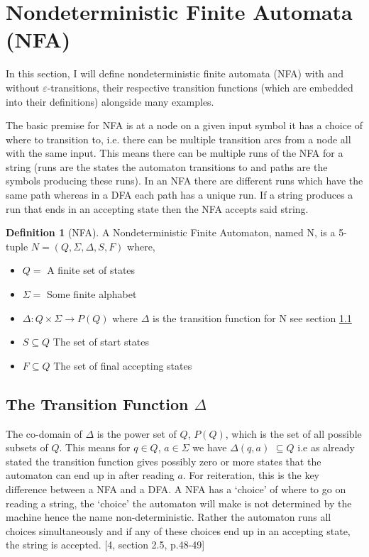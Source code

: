 \documentclass[a4paper,12pt]{report}
\theoremstyle{definition}
\newtheorem{definition}{Definition}[subsection]
\begin{document}
\section{Nondeterministic Finite Automata (NFA)}
\label{NFA}  
In this section, I will define nondeterministic finite automata (NFA) with and without $\varepsilon$-transitions, their respective transition functions (which are embedded into their definitions) alongside many examples. 

The basic premise for NFA is at a node on a given input symbol it has a choice of where to transition to, i.e. there can be multiple transition arcs from a node all with the same input. This means there can be multiple runs of the NFA for a string (runs are the states the automaton transitions to and paths are the symbols producing these runs).  In an NFA there are different runs which have the same path whereas in a DFA each path has a unique run. If a string produces a run that ends in an accepting state then the NFA accepts said string. 

\begin{definition}[NFA]
\label{NFAdef}
A Nondeterministic Finite Automaton, named N, is a 5-tuple $N=(Q,\Sigma,\Delta,S,F)$ where, 
\begin{itemize}
    \item[] $Q=$ A finite set of states
    \item[] $\Sigma=$ Some finite alphabet
    \item[]  $\Delta: Q\times \Sigma \rightarrow P(Q) $ where $\Delta$ is the transition function for N see section \ref{Delta}
    \item[] $S\subseteq Q$ The set of start states
    \item[] $F\subseteq Q$ The set of final accepting states
\end{itemize}
\end{definition}

\subsection{The Transition Function $\Delta$}
\label{Delta}
The co-domain of  $\Delta$  is the power set of $Q$, $P(Q)$, which is the set of all possible subsets of $Q$. This means for $q\in Q$, $a\in \Sigma$ we have 
$\Delta(q,a)$ $\subseteq Q$ i.e as already stated the transition function gives possibly zero or more states that the automaton can end up in after reading $a$. For reiteration, this is the key difference between a NFA and a DFA. A NFA has a `choice' of where to go on reading a string,  the `choice' the automaton will make is not determined by the machine hence the name non-deterministic. Rather the automaton runs all choices simultaneously and if any of these choices end up in an accepting state, the string is accepted.  [4, section 2.5, p.48-49]
\end{document}
